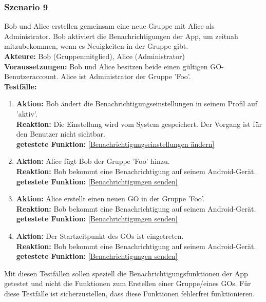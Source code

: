 \documentclass[parskip=full]{scrartcl}
\def\threedigits#1{%
  \ifnum#1<100 0\fi
  \ifnum#1<10 0\fi
  \number#1}
\begin{document}
\subsubsection*{Szenario 9} Bob und Alice erstellen gemeinsam eine neue Gruppe mit Alice als Administrator. Bob aktiviert die Benachrichtigungen der App, um zeitnah mitzubekommen, wenn es Neuigkeiten in der Gruppe gibt.\\

\textbf{Akteure: }Bob (Gruppenmitglied), Alice (Administrator)\\

\textbf{Voraussetzungen: }Bob und Alice besitzen beide einen gültigen GO-Benutzeraccount. Alice ist Administrator der Gruppe 'Foo'.\\

\textbf{Testfälle:}
\begin{enumerate}[label={\textbf{/T\protect\threedigits{\theenumi}0/}}, leftmargin=*, resume]
	\item \textbf{Aktion:} Bob ändert die Benachrichtigungseinstellungen in seinem Profil auf 'aktiv'.\\
	\textbf{Reaktion: }Die Einstellung wird vom System gespeichert. Der Vorgang ist für den Benutzer nicht sichtbar.\\
	\textbf{getestete Funktion:} \ref{Benachrichtigungseinstellungen ändern}
	\item \textbf{Aktion:} Alice fügt Bob der Gruppe 'Foo' hinzu.\\
	\textbf{Reaktion: }Bob bekommt eine Benachrichtigung auf seinem Android-Gerät.\\
	\textbf{getestete Funktion:} \ref{Benachrichtigungen senden}
	\item \textbf{Aktion:} Alice erstellt einen neuen GO in der Gruppe 'Foo'.\\
	\textbf{Reaktion: }Bob bekommt eine Benachrichtigung auf seinem Android-Gerät.\\
	\textbf{getestete Funktion:} \ref{Benachrichtigungen senden}
	\item \textbf{Aktion:} Der Startzeitpunkt des GOs ist eingetreten.\\
	\textbf{Reaktion: }Bob bekommt eine Benachrichtigung auf seinem Android-Gerät.\\
	\textbf{getestete Funktion:} \ref{Benachrichtigungen senden}
\end{enumerate}
Mit diesen Testfällen sollen speziell die Benachrichtigungsfunktionen der App getestet und nicht die Funktionen zum Erstellen einer Gruppe/eines GOs. Für diese Testfälle ist sicherzustellen, dass diese Funktionen fehlerfrei funktionieren.


\newpage
\printglossary	
\end{document}
